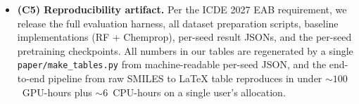 \begin{itemize}
\item \textbf{(C5) Reproducibility artifact.} Per the ICDE 2027 EAB
requirement, we release the full evaluation harness, all dataset
preparation scripts, baseline implementations (RF + Chemprop), per-seed
result JSONs, and the per-seed pretraining checkpoints. All numbers in
our tables are regenerated by a single
\texttt{paper/make\_tables.py} from machine-readable per-seed JSON,
and the end-to-end pipeline from raw SMILES to LaTeX table reproduces
in under $\sim 100$~GPU-hours plus $\sim 6$~CPU-hours on a single user's
allocation.
\end{itemize}

